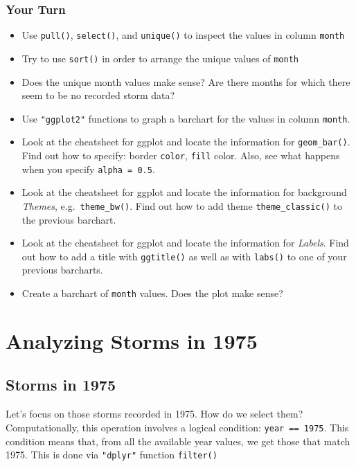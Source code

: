 \documentclass[
]{book}
\begin{document}
\hypertarget{your-turn}{%
\section{Your Turn}\label{your-turn}}

\begin{itemize}
\item
  Use \texttt{pull()}, \texttt{select()}, and \texttt{unique()} to inspect the values in column
  \texttt{month}
\item
  Try to use \texttt{sort()} in order to arrange the unique values of \texttt{month}
\item
  Does the unique month values make sense? Are there months for which there
  seem to be no recorded storm data?
\item
  Use \texttt{"ggplot2"} functions to graph a barchart for the values in column
  \texttt{month}.
\item
  Look at the cheatsheet for ggplot and locate the information for \texttt{geom\_bar()}.
  Find out how to specify: border \texttt{color}, \texttt{fill} color. Also, see what happens
  when you specify \texttt{alpha\ =\ 0.5}.
\item
  Look at the cheatsheet for ggplot and locate the information for background
  \emph{Themes}, e.g.~\texttt{theme\_bw()}. Find out how to add theme \texttt{theme\_classic()} to the
  previous barchart.
\item
  Look at the cheatsheet for ggplot and locate the information for \emph{Labels}.
  Find out how to add a title with \texttt{ggtitle()} as well as with \texttt{labs()} to one
  of your previous barcharts.
\item
  Create a barchart of \texttt{month} values. Does the plot make sense?
\end{itemize}

\hypertarget{part-analyzing-storms-in-1975}{%
\part{Analyzing Storms in 1975}\label{part-analyzing-storms-in-1975}}

\hypertarget{storms-in-1975}{%
\chapter{Storms in 1975}\label{storms-in-1975}}

Let's focus on those storms recorded in 1975. How do we select them?
Computationally, this operation involves a logical condition: \texttt{year\ ==\ 1975}.
This condition means that, from all the available year values, we get those
that match 1975. This is done via \texttt{"dplyr"} function \texttt{filter()}
\end{document}
